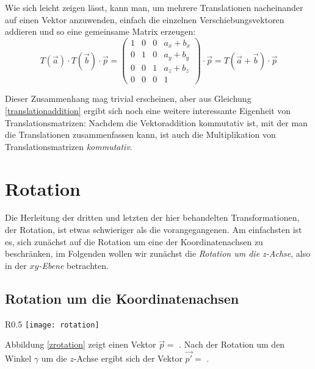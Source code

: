 Wie sich leicht zeigen lässt, kann man, um mehrere Translationen nacheinander auf einen Vektor anzuwenden, einfach die einzelnen Verschiebungsvektoren addieren und so eine gemeinsame Matrix erzeugen:
\begin{equation}
 \label{translationaddition}
 T{(\vec a)} \cdot T{(\vec b)} \cdot \vec p = 
 \begin{pmatrix}
  1 & 0 & 0 & a_x + b_x \\
  0 & 1 & 0 & a_y + b_y \\
  0 & 0 & 1 & a_z + b_z \\
  0 & 0 & 0 & 1
 \end{pmatrix} \cdot \vec p = T{(\vec a + \vec b)} \cdot \vec p
\end{equation}

Dieser Zusammenhang mag trivial erscheinen, aber aus Gleichung \ref{translationaddition} ergibt sich noch eine weitere interessante Eigenheit von Translationsmatrizen: Nachdem die Vektoraddition kommutativ ist, mit der man die Translationen zusammenfassen kann, ist auch die Multiplikation von Translationsmatrizen \emph{kommutativ}.

\section{Rotation}
Die Herleitung der dritten und letzten der hier behandelten Transformationen, der Rotation, ist etwas schwieriger als die vorangegangenen. Am einfachsten ist es, sich zunächst auf die Rotation um eine der Koordinatenachsen zu beschränken, im Folgenden wollen wir zunächst die \emph{Rotation um die z-Achse}, also in der \emph{$xy$-Ebene} betrachten.

\subsection{Rotation um die Koordinatenachsen}

\begin{wrapfigure}{R}{0.5\textwidth}
  \vspace{-15pt}
  \texttt{[image: rotation]}
  \vspace{-15pt}
  \caption{Rotation um die $z$-Achse.}
  \label{zrotation}
\end{wrapfigure}

Abbildung \ref{zrotation} zeigt einen Vektor $\vec p = $ . Nach der Rotation um den Winkel $\gamma$ um die $z$-Achse ergibt sich der Vektor $\vec{p'} = $ .

